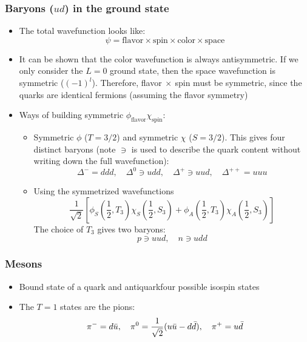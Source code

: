 \subsubsection{Baryons ($ud$) in the ground state}
\begin{itemize}
  \item The total wavefunction looks like:
  \begin{equation}
    \psi = \text{flavor}\times\text{spin}\times\text{color}\times\text{space}
  \end{equation}
  \item It can be shown that the color wavefunction is always antisymmetric. If we only consider the $L=0$ ground state, then the space wavefunction is symmetric ($(-1)^l$). Therefore, flavor$~\times~$spin must be symmetric, since the quarks are identical fermions (assuming the flavor symmetry)
  \item Ways of building symmetric $\phi_\text{flavor}\chi_\text{spin}$:
  \begin{itemize}
    \item Symmetric $\phi$ ($T=3/2$) and symmetric $\chi$ ($S=3/2$). This gives four distinct baryons (note $\ni$ is used to describe the quark content without writing down the full wavefunction):
    \begin{equation}
      \Delta^- = ddd,\quad
      \Delta^0 \ni udd,\quad
      \Delta^+ \ni uud,\quad
      \Delta^{++} = uuu
    \end{equation}
    \item Using the symmetrized wavefunctions 
    \begin{equation}
    \dfrac{1}{\sqrt2}\left[\phi_S\left(\frac{1}{2},T_3\right)\chi_S\left(\frac{1}{2},S_3\right)+\phi_A\left(\frac{1}{2},T_3\right)\chi_A\left(\frac{1}{2},S_3\right)\right]
    \end{equation}
    The choice of $T_3$ gives two baryons:
    \begin{equation}
      p \ni uud, \quad n \ni udd
    \end{equation}
  \end{itemize}
\end{itemize}

\subsubsection{Mesons}
\begin{itemize}
  \item Bound state of a quark and antiquark\thus four possible isospin states
  \item The $T=1$ states are the pions:
  \begin{equation}
    \pi^- = d\bar{u},\quad \pi^0 = \frac{1}{\sqrt2} (u\bar{u}-d\bar{d}),\quad \pi^+ = u\bar{d}
  \end{equation}
\end{itemize}

